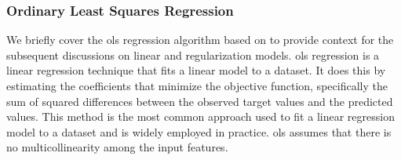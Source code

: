 \subsubsection{Ordinary Least Squares Regression}
We briefly cover the \gls{ols} regression algorithm based on \citet{James2023AnIS} to provide context for the subsequent discussions on linear and regularization models.
\gls{ols} regression is a linear regression technique that fits a linear model to a dataset.
It does this by estimating the coefficients that minimize the objective function, specifically the sum of squared differences between the observed target values and the predicted values.
This method is the most common approach used to fit a linear regression model to a dataset and is widely employed in practice.
\gls{ols} assumes that there is no multicollinearity among the input features.